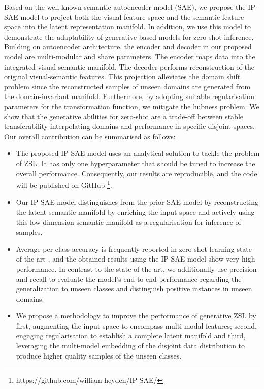\documentclass{article}
\begin{document}
Based on the well-known semantic autoencoder model \cite{b10} (SAE), we propose the IP-SAE model to project both the visual feature space and the semantic feature space into the latent representation manifold. In addition, we use this model to demonstrate the adaptability of generative-based models for zero-shot inference. Building on autoencoder architecture, the encoder and decoder in our proposed model are multi-modular and share parameters. The encoder maps data into the integrated visual-semantic manifold. The decoder performs reconstruction of the original visual-semantic features. This projection alleviates the domain shift problem since the reconstructed samples of unseen domains are generated from the domain-invariant manifold. Furthermore, by adopting suitable regularisation parameters for the transformation function, we mitigate the hubness problem. We show that the generative abilities for zero-shot are a trade-off between stable transferability interpolating domains and performance in specific disjoint spaces. Our overall contribution can be summarised as follows:
\begin{itemize}
    \item  The proposed IP-SAE model uses an analytical solution to tackle the problem of ZSL. It has only one hyperparameter that should be tuned to increase the overall performance. Consequently, our results are reproducible, and the code will be published on GitHub \footnote{https://github.com/william-heyden/IP-SAE/}.
    \item Our IP-SAE model distinguishes from the prior SAE model \cite{b10} by reconstructing the latent semantic manifold by enriching the input space and actively using this low-dimension semantic manifold as a regularisation for inference of samples. 
    \item Average per-class accuracy is frequently reported in zero-shot learning state-of-the-art \cite{b56}, and the obtained results using the IP-SAE model show very high performance. In contrast to the state-of-the-art, we additionally use precision and recall to evaluate the model's end-to-end performance regarding the generalization to unseen classes and distinguish positive instances in unseen domains.
    \item We propose a methodology to improve the performance of generative ZSL by first, augmenting the input space to encompass multi-modal features; second, engaging regularisation to establish a complete latent manifold and third, leveraging the multi-model embedding of the disjoint data distribution to produce higher quality samples of the unseen classes.
\end{itemize}
\end{document}
